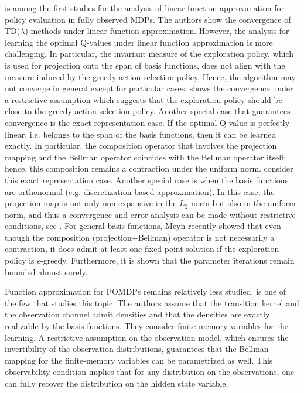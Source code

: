 \documentclass[letterpaper, 10 pt, conference]{ieeeconf}  %
\theoremstyle{definition}
\theoremstyle{remark}
\begin{document}
\cite{tsitsiklis1997analysis} is among the first studies for the analysis of linear function approximation for policy evaluation in fully observed MDPs. The authors show the convergence of TD($\lambda$) methods under linear function approximation. However, the analysis for learning the optimal Q-values under linear function approximation is more challenging. In particular, the invariant measure of the exploration policy, which is used for projection onto the span of basis functions, does not align with the measure induced by the greedy action selection policy.  Hence, the algorithm may not converge in general except for particular cases.  \cite{melo2008analysis} shows the convergence under a restrictive assumption which suggests that the exploration policy should be close to the greedy action selection policy. Another special case that guarantees convergence is the exact representation case. If the optimal Q value is perfectly linear, i.e. belongs to the span of the basis functions, then it can be learned exactly. In particular, the composition operator that involves the projection mapping and the Bellman operator coincides with the Bellman operator itself;  hence, this composition remains a contraction under the uniform norm. \cite{Ruszczy2024,jin2023provably} consider this exact representation case. Another special case is when the basis functions are orthonormal (e.g. discretization based approximation). In this case, the projection map is not only non-expansive in the $L_2$ norm but also in the uniform norm, and thus a convergence and error analysis can be made without restrictive conditions, see \cite{kara2023q}.  For general basis functions, Meyn \cite{meyn2024projected} recently showed that even though the composition (projection+Bellman) operator is not necessarily a contraction, it does admit at least one fixed point solution if the exploration policy is $\epsilon$-greedy. Furthermore, it is shown that the parameter iterations remain bounded almost surely.

Function approximation for POMDPs remains relatively less studied. \cite{cai2022reinforcement} is one of the few that studies this topic. The authors assume that the transition kernel and the observation channel admit densities and that the densities are exactly realizable by the basis functions. They consider finite-memory variables for the learning.  A restrictive assumption on the observation model, which ensures the invertibility of the observation distributions, guarantees that the Bellman mapping for the finite-memory variables can be parametrized as well. This observability condition implies that for any distribution on the observations, one can fully recover the distribution on the hidden state variable. 
\end{document}
